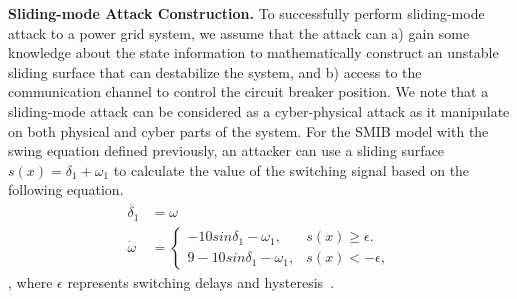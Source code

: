 \vspace{0.5em}
\noindent
{\bf Sliding-mode Attack Construction.} To successfully perform sliding-mode attack to a power grid system, we assume that the attack can a) gain some knowledge about the state information to mathematically construct an unstable sliding surface that can destabilize the system, and b) access to the communication channel to control the circuit breaker position. We note that a sliding-mode attack can be considered as a cyber-physical attack as it manipulate on both physical and cyber parts of the system. For the SMIB model with the swing equation defined previously, an attacker can use a sliding surface $s(x) = \delta_1 + \omega_1$ to calculate the value of the switching signal based on the following equation.
%
\begin{align}
\dot{\delta_1} & = \omega \nonumber \\
\dot{\omega} & = 
\begin{cases}
    -10sin\delta_1 - \omega_1, & \text{$s(x) \geq \epsilon$}.\\
    9 - 10sin\delta_1 - \omega_1, & \text{$s(x) < -\epsilon$},
 \end{cases} \nonumber
\end{align},
where $\epsilon$ represents switching delays and hysteresis~\cite{liu2011class}.
%

